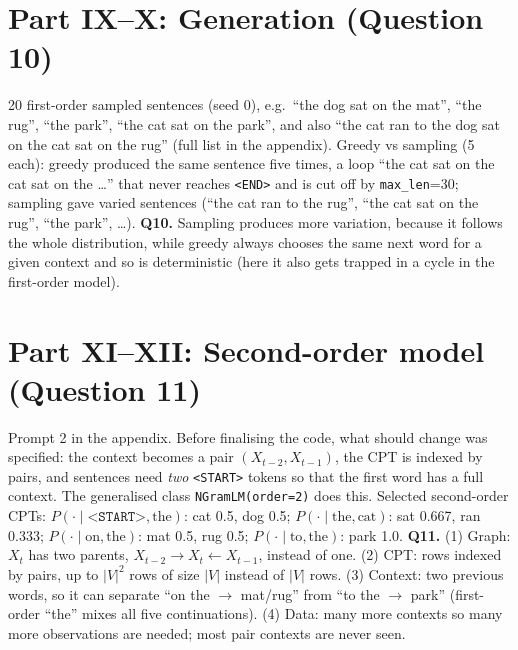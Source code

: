 \documentclass[10pt,a4paper]{article}
\begin{document}
\section*{Part IX--X: Generation (Question 10)}
20 first-order sampled sentences (seed 0), e.g.\ ``the dog sat on the mat'', ``the rug'', ``the park'', ``the cat sat on the park'', and also ``the cat ran to the dog sat on the cat sat on the rug'' (full list in the appendix). Greedy vs sampling (5 each): greedy produced the same sentence five times, a loop ``the cat sat on the cat sat on the \dots'' that never reaches \texttt{<END>} and is cut off by \texttt{max\_len}=30; sampling gave varied sentences (``the cat ran to the rug'', ``the cat sat on the rug'', ``the park'', \dots).
\textbf{Q10.} Sampling produces more variation, because it follows the whole distribution, while greedy always chooses the same next word for a given context and so is deterministic (here it also gets trapped in a cycle in the first-order model).

\section*{Part XI--XII: Second-order model (Question 11)}
Prompt 2 in the appendix. Before finalising the code, what should change was specified: the context becomes a pair $(X_{t-2},X_{t-1})$, the CPT is indexed by pairs, and sentences need \emph{two} \texttt{<START>} tokens so that the first word has a full context. The generalised class \texttt{NGramLM(order=2)} does this.
Selected second-order CPTs: $P(\cdot\mid\texttt{<START>},\text{the})$: cat 0.5, dog 0.5; $P(\cdot\mid\text{the},\text{cat})$: sat 0.667, ran 0.333; $P(\cdot\mid\text{on},\text{the})$: mat 0.5, rug 0.5; $P(\cdot\mid\text{to},\text{the})$: park 1.0.
\textbf{Q11.} (1) Graph: $X_t$ has two parents, $X_{t-2}\to X_t\leftarrow X_{t-1}$, instead of one. (2) CPT: rows indexed by pairs, up to $|V|^2$ rows of size $|V|$ instead of $|V|$ rows. (3) Context: two previous words, so it can separate ``on the $\to$ mat/rug'' from ``to the $\to$ park'' (first-order ``the'' mixes all five continuations). (4) Data: many more contexts so many more observations are needed; most pair contexts are never seen.
\end{document}

